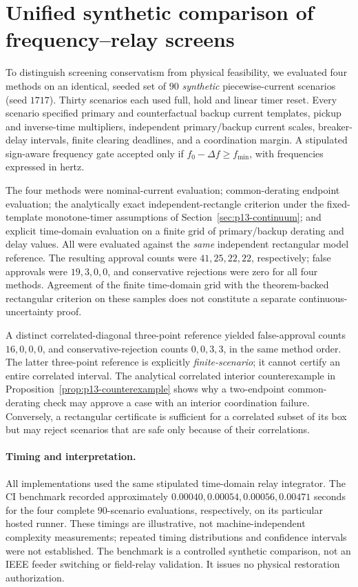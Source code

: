 \section{Unified synthetic comparison of frequency--relay screens}
\label{sec:p17-benchmark}
To distinguish screening conservatism from physical feasibility, we evaluated four methods on an identical, seeded set of \(90\) \emph{synthetic} piecewise-current scenarios (seed \(1717\)). Thirty scenarios each used full, hold and linear timer reset. Every scenario specified primary and counterfactual backup current templates, pickup and inverse-time multipliers, independent primary/backup current scales, breaker-delay intervals, finite clearing deadlines, and a coordination margin. A stipulated sign-aware frequency gate accepted only if \(f_0-\Delta f\ge f_{\min}\), with frequencies expressed in hertz.

The four methods were nominal-current evaluation; common-derating endpoint evaluation; the analytically exact independent-rectangle criterion under the fixed-template monotone-timer assumptions of Section~\ref{sec:p13-continuum}; and explicit time-domain evaluation on a finite grid of primary/backup derating and delay values. All were evaluated against the \emph{same} independent rectangular model reference. The resulting approval counts were \(41,25,22,22\), respectively; false approvals were \(19,3,0,0\), and conservative rejections were zero for all four methods. Agreement of the finite time-domain grid with the theorem-backed rectangular criterion on these samples does not constitute a separate continuous-uncertainty proof.

A distinct correlated-diagonal three-point reference yielded false-approval counts \(16,0,0,0\), and conservative-rejection counts \(0,0,3,3\), in the same method order. The latter three-point reference is explicitly \emph{finite-scenario}; it cannot certify an entire correlated interval. The analytical correlated interior counterexample in Proposition~\ref{prop:p13-counterexample} shows why a two-endpoint common-derating check may approve a case with an interior coordination failure. Conversely, a rectangular certificate is sufficient for a correlated subset of its box but may reject scenarios that are safe only because of their correlations.

\paragraph{Timing and interpretation.}
All implementations used the same stipulated time-domain relay integrator. The CI benchmark recorded approximately \(0.00040,0.00054,0.00056,0.00471\) seconds for the four complete \(90\)-scenario evaluations, respectively, on its particular hosted runner. These timings are illustrative, not machine-independent complexity measurements; repeated timing distributions and confidence intervals were not established. The benchmark is a controlled synthetic comparison, not an IEEE feeder switching or field-relay validation. It issues no physical restoration authorization.